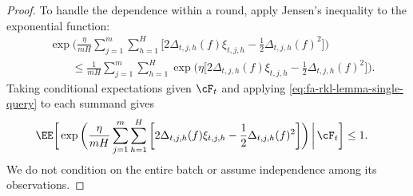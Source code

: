 \documentclass[11pt]{article}
\begin{document}
\begin{proof}
To handle the dependence within a round, apply Jensen's
inequality to the exponential function:
\begin{align*}
    &\exp\bigg(
        \frac{\eta}{mH}
        \sum_{j=1}^m\sum_{h=1}^H
        \bigg[
            2\Delta_{t,j,h}(f)\xi_{t,j,h}
            -
            \frac12\Delta_{t,j,h}(f)^2
        \bigg]
    \bigg)\\
    &\qquad\leq
    \frac1{mH}
    \sum_{j=1}^m\sum_{h=1}^H
    \exp\bigg(
        \eta\bigg[
            2\Delta_{t,j,h}(f)\xi_{t,j,h}
            -
            \frac12\Delta_{t,j,h}(f)^2
        \bigg]
    \bigg).
\end{align*}
Taking conditional expectations given $\cF_t$ and
applying \eqref{eq:fa-rkl-lemma-single-query}
to each summand gives
\begin{align}
    &\EE\bigg[
        \exp\bigg(
            \frac{\eta}{mH}
            \sum_{j=1}^m\sum_{h=1}^H
            \bigg[
                2\Delta_{t,j,h}(f)\xi_{t,j,h}
                -
                \frac12\Delta_{t,j,h}(f)^2
            \bigg]
        \bigg)
        \,\bigg|\,
        \cF_t
    \bigg]
    \leq1.
    \label{eq:fa-rkl-lemma-round-exponential}
\end{align}
We do not condition on the entire batch or assume
independence among its observations.


\end{proof}
\end{document}
